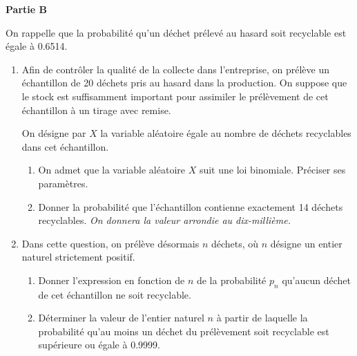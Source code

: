 \medskip

\textbf{Partie B}

\medskip

On rappelle que la probabilité qu'un déchet prélevé au hasard soit recyclable est égale à \num{0,6514}.

\begin{enumerate}
	\item Afin de contrôler la qualité de la collecte dans l'entreprise, on prélève un échantillon de 20 déchets pris au hasard dans la production. On suppose que le stock est suffisamment important pour assimiler le prélèvement de cet échantillon à un tirage avec remise.
	
	On désigne par $X$ la variable aléatoire égale au nombre de déchets recyclables dans cet échantillon.
	\begin{enumerate}
		\item On admet que la variable aléatoire $X$ suit une loi binomiale. Préciser ses paramètres.
		\item Donner la probabilité que l'échantillon contienne exactement 14 déchets recyclables. \emph{On donnera la valeur arrondie au dix-millième.}
	\end{enumerate}
	\item Dans cette question, on prélève désormais $n$ déchets, où $n$ désigne un entier naturel strictement positif.
	\begin{enumerate}
		\item Donner l'expression en fonction de $n$ de la probabilité $p_{n}$ qu'aucun déchet de cet échantillon ne soit recyclable.
		\item Déterminer la valeur de l'entier naturel $n$ à partir de laquelle la probabilité qu'au moins un déchet du prélèvement soit recyclable est supérieure ou égale à \num{0,9999}.
	\end{enumerate}
\end{enumerate}
